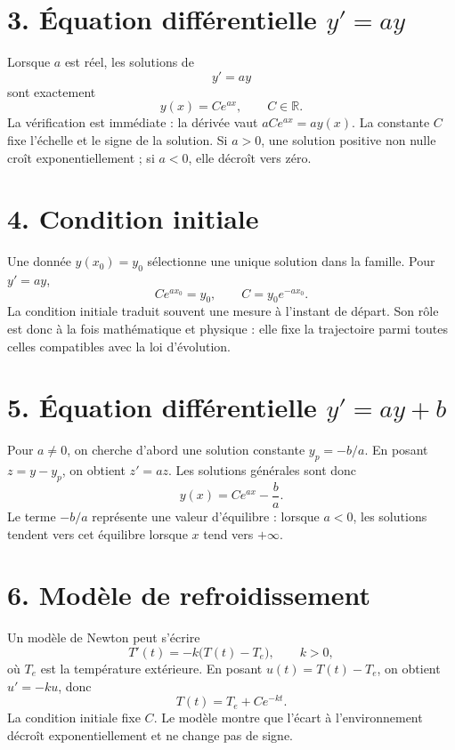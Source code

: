 
\section{3. Équation différentielle $y'=ay$}
Lorsque $a$ est réel, les solutions de
\[
y'=ay
\]
sont exactement
\[
y(x)=Ce^{ax},\qquad C\in\mathbb{R}.
\]
La vérification est immédiate : la dérivée vaut $aCe^{ax}=ay(x)$. La constante $C$ fixe l’échelle et le signe de la solution. Si $a>0$, une solution positive non nulle croît exponentiellement ; si $a<0$, elle décroît vers zéro.

\section{4. Condition initiale}
Une donnée $y(x_0)=y_0$ sélectionne une unique solution dans la famille. Pour $y'=ay$,
\[
Ce^{ax_0}=y_0,\qquad C=y_0e^{-ax_0}.
\]
La condition initiale traduit souvent une mesure à l’instant de départ. Son rôle est donc à la fois mathématique et physique : elle fixe la trajectoire parmi toutes celles compatibles avec la loi d’évolution.

\section{5. Équation différentielle $y'=ay+b$}
Pour $a\neq0$, on cherche d’abord une solution constante $y_p=-b/a$. En posant $z=y-y_p$, on obtient $z'=az$. Les solutions générales sont donc
\[
y(x)=Ce^{ax}-\frac ba.
\]
Le terme $-b/a$ représente une valeur d’équilibre : lorsque $a<0$, les solutions tendent vers cet équilibre lorsque $x$ tend vers $+\infty$.


\section{6. Modèle de refroidissement}
Un modèle de Newton peut s’écrire
\[
T'(t)=-k\bigl(T(t)-T_e\bigr),\qquad k>0,
\]
où $T_e$ est la température extérieure. En posant $u(t)=T(t)-T_e$, on obtient $u'=-ku$, donc
\[
T(t)=T_e+Ce^{-kt}.
\]
La condition initiale fixe $C$. Le modèle montre que l’écart à l’environnement décroît exponentiellement et ne change pas de signe.

